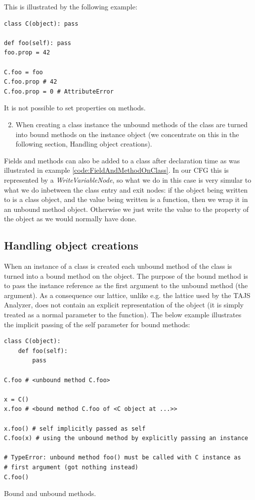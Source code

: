 This is illustrated by the following example:

\begin{listing}[H]
	\begin{verbatim}
class C(object): pass

def foo(self): pass
foo.prop = 42

C.foo = foo
C.foo.prop # 42
C.foo.prop = 0 # AttributeError
	\end{verbatim}
	\caption{It is not possible to set properties on methods.}\label{code:FieldAndMethodOnClass}
\end{listing}

\begin{enumerate}
\setcounter{enumi}{1}
	\item When creating a class instance the unbound methods of the class are turned into bound methods on the instance object (we concentrate on this in the following section, Handling object creations).
\end{enumerate}

Fields and methods can also be added to a class after declaration time as was illustrated in example \ref{code:FieldAndMethodOnClass}. In our CFG this is represented by a \textit{WriteVariableNode}, so what we do in this case is very simular to what we do inbetween the class entry and exit nodes: if the object being written to is a class object, and the value being written is a function, then we wrap it in an unbound method object. Otherwise we just write the value to the property of the object as we would normally have done.


\subsection{Handling object creations}
When an instance of a class is created each unbound method of the class is turned into a bound method on the object. The purpose of the bound method is to pass the instance reference as the first argument to the unbound method (the  argument). As a consequence our lattice, unlike e.g. the lattice used by the TAJS Analyzer, does not contain an explicit representation of the  object (it is simply treated as a normal parameter to the function). The below example illustrates the implicit passing of the self parameter for bound methods:

\begin{listing}[H]
	\begin{verbatim}
class C(object):
	def foo(self):
		pass

C.foo # <unbound method C.foo>

x = C()
x.foo # <bound method C.foo of <C object at ...>>

x.foo() # self implicitly passed as self
C.foo(x) # using the unbound method by explicitly passing an instance

# TypeError: unbound method foo() must be called with C instance as 
# first argument (got nothing instead)
C.foo()
	\end{verbatim}
	\caption{Bound and unbound methods.}\label{code:BoundAndUnboundMethodsOnClass}
\end{listing}

